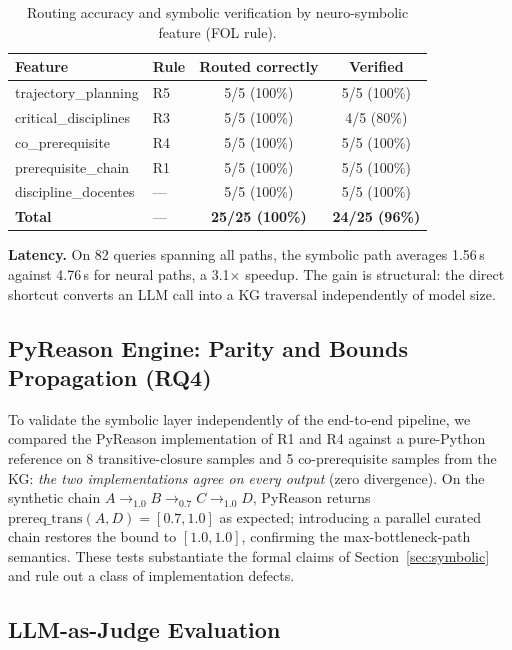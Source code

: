 \documentclass[12pt]{article}
\begin{document}
\begin{table}[ht]
\centering
\caption{Routing accuracy and symbolic verification by neuro-symbolic feature (FOL rule).}
\label{tab:nsfeat}
\begin{tabular}{llcc}
\hline
\textbf{Feature} & \textbf{Rule} & \textbf{Routed correctly} & \textbf{Verified} \\
\hline
trajectory\_planning      & R5 & 5/5 (100\%) & 5/5 (100\%) \\
critical\_disciplines     & R3 & 5/5 (100\%) & 4/5 (80\%)  \\
co\_prerequisite          & R4 & 5/5 (100\%) & 5/5 (100\%) \\
prerequisite\_chain       & R1 & 5/5 (100\%) & 5/5 (100\%) \\
discipline\_docentes      & --- & 5/5 (100\%) & 5/5 (100\%) \\
\hline
\textbf{Total}            & --- & \textbf{25/25 (100\%)} & \textbf{24/25 (96\%)} \\
\hline
\end{tabular}
\end{table}

\noindent\textbf{Latency.} On 82 queries spanning all paths, the symbolic path averages 1.56\,s against 4.76\,s for neural paths, a 3.1$\times$ speedup. The gain is structural: the direct shortcut converts an LLM call into a KG traversal independently of model size.


\subsection{PyReason Engine: Parity and Bounds Propagation (RQ4)}

To validate the symbolic layer independently of the end-to-end pipeline, we compared the PyReason implementation of R1 and R4 against a pure-Python reference on 8 transitive-closure samples and 5 co-prerequisite samples from the KG: \emph{the two implementations agree on every output} (zero divergence). On the synthetic chain $A \rightarrow_{1.0} B \rightarrow_{0.7} C \rightarrow_{1.0} D$, PyReason returns $\mathrm{prereq\_trans}(A,D) = [0.7,1.0]$ as expected; introducing a parallel curated chain restores the bound to $[1.0,1.0]$, confirming the max-bottleneck-path semantics. These tests substantiate the formal claims of Section~\ref{sec:symbolic} and rule out a class of implementation defects.

\subsection{LLM-as-Judge Evaluation}
\end{document}
